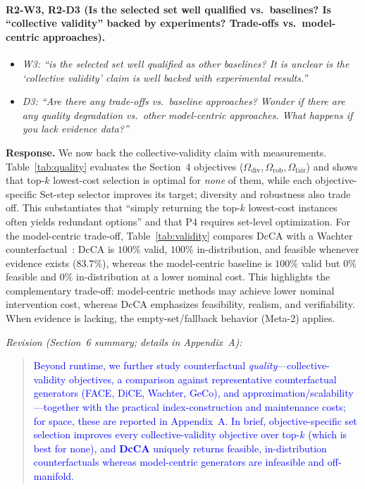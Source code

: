 \paragraph{R2-W3, R2-D3 (Is the selected set well qualified vs.\ baselines? Is ``collective validity'' backed by experiments? Trade-offs vs.\ model-centric approaches).}

\begin{itemize}[leftmargin=1.2em, itemsep=1pt, topsep=2pt]
\item \textit{W3: ``is the selected set well qualified as other baselines? It is unclear is the `collective validity' claim is well backed with experimental results.''}
\item \textit{D3: ``Are there any trade-offs vs.\ baseline approaches? Wonder if there are any quality degradation vs.\ other model-centric approaches. What happens if you lack evidence data?''}
\end{itemize}
\smallskip

\noindent\textbf{Response.}
We now back the collective-validity claim with measurements. Table~\ref{tab:quality} evaluates the Section~4 objectives ($\Omega_{\text{div}},\Omega_{\text{rob}},\Omega_{\text{fair}}$) and shows that top-$k$ lowest-cost selection is optimal for \emph{none} of them, while each objective-specific Set-step selector improves its target; diversity and robustness also trade off. This substantiates that ``simply returning the top-$k$ lowest-cost instances often yields redundant options'' and that P4 requires set-level optimization. For the model-centric trade-off, Table~\ref{tab:validity} compares DcCA with a Wachter counterfactual~\cite{wachter2017counterfactual}: DcCA is $100\%$ valid, $100\%$ in-distribution, and feasible whenever evidence exists ($83.7\%$), whereas the model-centric baseline is $100\%$ valid but $0\%$ feasible and $0\%$ in-distribution at a lower nominal cost. This highlights the complementary trade-off: model-centric methods may achieve lower nominal intervention cost, whereas DcCA emphasizes feasibility, realism, and verifiability. When evidence is lacking, the empty-set/fallback behavior (Meta-2) applies.

\noindent\emph{Revision (Section~6 summary; details in Appendix~A):}
\begin{quote}
\textcolor{blue}{Beyond runtime, we further study counterfactual \emph{quality}---collective-validity objectives, a comparison against representative counterfactual generators (FACE, DiCE, Wachter, GeCo), and approximation/scalability---together with the practical index-construction and maintenance costs; for space, these are reported in Appendix~A. In brief, objective-specific set selection improves every collective-validity objective over top-$k$ (which is best for none), and \textbf{DcCA} uniquely returns feasible, in-distribution counterfactuals whereas model-centric generators are infeasible and off-manifold.}
\end{quote}
